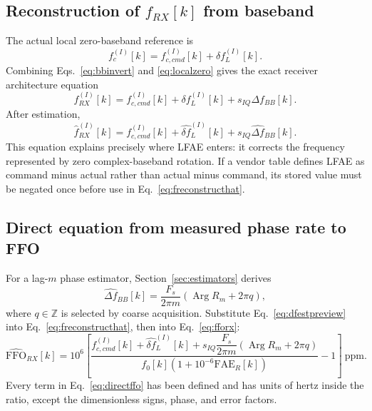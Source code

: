 \documentclass[10pt,a4paper]{article}
\newcommand{\FFO}{\mathrm{FFO}}
\newcommand{\FAE}{\mathrm{FAE}}
\newcommand{\argp}{\operatorname{Arg}}
\begin{document}
\subsection{Reconstruction of $f_{RX}[k]$ from baseband}
The actual local zero-baseband reference is
\begin{equation}
f_c^{(I)}[k]=f_{c,cmd}^{(I)}[k]+\delta f_L^{(I)}[k].
\label{eq:localzero}
\end{equation}
Combining Eqs.~\ref{eq:bbinvert} and \ref{eq:localzero} gives the exact receiver architecture equation
\begin{equation}
f_{RX}^{(I)}[k]
=f_{c,cmd}^{(I)}[k]+\delta f_L^{(I)}[k]+s_{IQ}\Delta f_{BB}[k].
\label{eq:freconstruct}
\end{equation}
After estimation,
\begin{equation}
\widehat f_{RX}^{(I)}[k]
=f_{c,cmd}^{(I)}[k]+\widehat{\delta f}_L^{(I)}[k]
+s_{IQ}\widehat{\Delta f}_{BB}[k].
\label{eq:freconstructhat}
\end{equation}
This equation explains precisely where LFAE enters: it corrects the frequency represented by zero complex-baseband rotation. If a vendor table defines LFAE as command minus actual rather than actual minus command, its stored value must be negated once before use in Eq.~\ref{eq:freconstructhat}.

\subsection{Direct equation from measured phase rate to FFO}
For a lag-$m$ phase estimator, Section~\ref{sec:estimators} derives
\begin{equation}
\widehat{\Delta f}_{BB}[k]
=\frac{F_s}{2\pi m}\left(\argp R_m+2\pi q\right),
\label{eq:dfestpreview}
\end{equation}
where $q\in\mathbb Z$ is selected by coarse acquisition. Substitute Eq.~\ref{eq:dfestpreview} into Eq.~\ref{eq:freconstructhat}, then into Eq.~\ref{eq:fforx}:
\begin{equation}
\boxed{\displaystyle
\widehat{\FFO}_{RX}[k]=10^6\left[
\frac{f_{c,cmd}^{(I)}[k]+\widehat{\delta f}_L^{(I)}[k]
+s_{IQ}\dfrac{F_s}{2\pi m}(\argp R_m+2\pi q)}
{f_0[k](1+10^{-6}\FAE_R[k])}-1\right]\ \text{ppm}.}
\label{eq:directffo}
\end{equation}
Every term in Eq.~\ref{eq:directffo} has been defined and has units of hertz inside the ratio, except the dimensionless signs, phase, and error factors.
\end{document}
